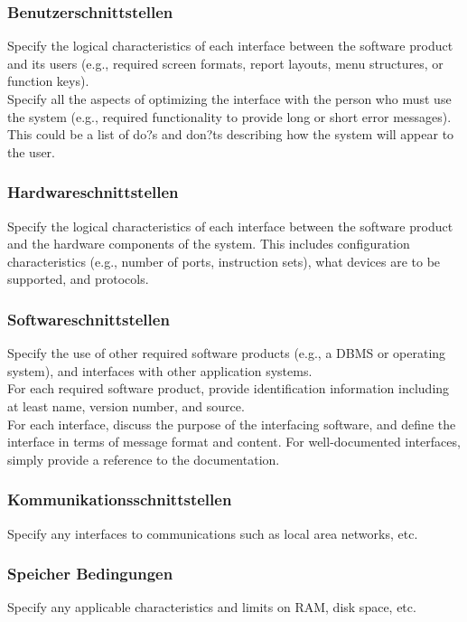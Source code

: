 \subsubsection{Benutzerschnittstellen}
Specify the logical characteristics of each interface between the software product and its users (e.g., required screen formats, report layouts, menu structures, or function keys). \\[-0.3cm]

\noindent Specify all the aspects of optimizing the interface with the person who must use the system (e.g., required functionality to provide long or short error messages). This could be a list of do?s and don?ts describing how the system will appear to the user.

\subsubsection{Hardwareschnittstellen}
Specify the logical characteristics of each interface between the software product and the hardware components of the system. This includes configuration characteristics (e.g., number of ports, instruction sets), what devices are to be supported, and protocols.

\subsubsection{Softwareschnittstellen}
Specify the use of other required software products (e.g., a DBMS or operating system), and interfaces with other application systems. \\[-0.3cm]

\noindent For each required software product, provide identification information including at least name, version number, and source. \\[-0.3cm]

\noindent For each interface, discuss the purpose of the interfacing software, and define the interface in terms of message format and content. For well-documented interfaces, simply provide a reference to the documentation. \\[-0.3cm]

\subsubsection{Kommunikationsschnittstellen}
Specify any interfaces to communications such as local area networks, etc.

\subsubsection{Speicher Bedingungen}
Specify any applicable characteristics and limits on RAM, disk space, etc.

